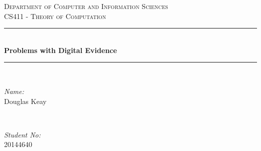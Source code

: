\documentclass[12pt]{article} %
\begin{document}

\begin{titlepage}
\vspace*{\fill}
\newcommand{\HRule}{\rule{\linewidth}{0.5mm}} %

\center %

\textsc{\LARGE Department of Computer and Information Sciences}\\[1.5cm] %
\textsc{\Large CS411 - Theory of Computation}\\[0.5cm] %

\HRule \\[0.4cm]
{ \huge \bfseries Problems with Digital Evidence}\\[0.4cm] %
\HRule \\[1.5cm]

\begin{minipage}{0.4\textwidth}
\begin{flushleft} \large
\emph{Name:}\\
Douglas Keay %
\end{flushleft}
\end{minipage}
~
\begin{minipage}{0.4\textwidth}
\begin{flushright} \large
\emph{Student No:} \\
20144640 %
\end{flushright}
\end{minipage}\\[4cm]
\vspace*{\fill}
\end{titlepage}


\thispagestyle{empty}

\tableofcontents %

\clearpage %

\setcounter{page}{1} %
\end{document}
